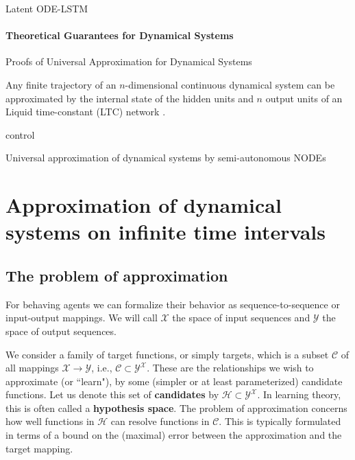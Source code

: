 \documentclass{article}
\theoremstyle{definition}
\theoremstyle{remark}
\begin{document}
Latent ODE-LSTM \citep{coelho2024enhancing}


\paragraph{Theoretical Guarantees for Dynamical Systems}
 Proofs of Universal Approximation for Dynamical Systems
 
 Any finite trajectory of an $n$-dimensional continuous dynamical system can be approximated by the internal state of the hidden units and $n$ output units of an Liquid time-constant (LTC) network \citep{hasani2018liquid}.
 
control \citep{tabuada2020universal}

\citep{zhang2020approximation}

\citep{li2022deep}

Universal approximation of dynamical systems by semi-autonomous NODEs \citep{li2024universal}








\section{Approximation of dynamical systems on infinite time intervals}

\subsection{The problem of approximation} %
For behaving agents we can formalize their behavior as sequence-to-sequence or input-output mappings.
We will call $\mathcal{X}$ the space of input sequences and $\mathcal{Y}$ the space of output sequences.

We consider a family of target functions, or simply targets, which is a subset \(\mathcal{C} \) of all mappings \( \mathcal{X} \rightarrow \mathcal{Y} \), i.e., \( \mathcal{C} \subset \mathcal{Y}^\mathcal{X} \). 
These are the relationships we wish to approximate (or ``learn"), by some (simpler or at least parameterized) candidate functions.
Let us denote this set of \textbf{candidates} by \( \mathcal{H} \subset \mathcal{Y}^\mathcal{X} \).
In learning theory, this is often called a \textbf{hypothesis space}.
The problem of approximation concerns how well functions in \( \mathcal{H} \) can resolve functions in \( \mathcal{C} \).
This is typically formulated in terms of a bound on the (maximal) error between the approximation and the target mapping.
\end{document}
